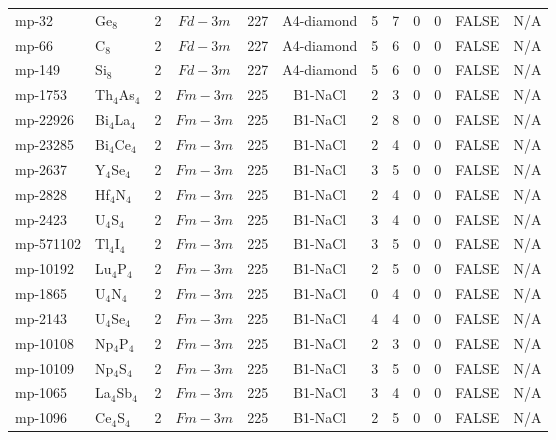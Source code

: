 {\begin{longtable}{llcccccccccc}
    mp-32 & Ge$_{8}$ & 2     & $Fd-3m$ & 227   & A4-diamond & 5     & 7     & 0     & 0     & FALSE & N/A \\
    mp-66 & C$_{8}$ & 2     & $Fd-3m$ & 227   & A4-diamond & 5     & 6     & 0     & 0     & FALSE & N/A \\
    mp-149 & Si$_{8}$ & 2     & $Fd-3m$ & 227   & A4-diamond & 5     & 6     & 0     & 0     & FALSE & N/A \\
    mp-1753 & Th$_{4}$As$_{4}$ & 2     & $Fm-3m$ & 225   & B1-NaCl & 2     & 3     & 0     & 0     & FALSE & N/A \\
    mp-22926 & Bi$_{4}$La$_{4}$ & 2     & $Fm-3m$ & 225   & B1-NaCl & 2     & 8     & 0     & 0     & FALSE & N/A \\
    mp-23285 & Bi$_{4}$Ce$_{4}$ & 2     & $Fm-3m$ & 225   & B1-NaCl & 2     & 4     & 0     & 0     & FALSE & N/A \\
    mp-2637 & Y$_{4}$Se$_{4}$ & 2     & $Fm-3m$ & 225   & B1-NaCl & 3     & 5     & 0     & 0     & FALSE & N/A \\
    mp-2828 & Hf$_{4}$N$_{4}$ & 2     & $Fm-3m$ & 225   & B1-NaCl & 2     & 4     & 0     & 0     & FALSE & N/A \\
    mp-2423 & U$_{4}$S$_{4}$ & 2     & $Fm-3m$ & 225   & B1-NaCl & 3     & 4     & 0     & 0     & FALSE & N/A \\
    mp-571102 & Tl$_{4}$I$_{4}$ & 2     & $Fm-3m$ & 225   & B1-NaCl & 3     & 5     & 0     & 0     & FALSE & N/A \\
    mp-10192 & Lu$_{4}$P$_{4}$ & 2     & $Fm-3m$ & 225   & B1-NaCl & 2     & 5     & 0     & 0     & FALSE & N/A \\
    mp-1865 & U$_{4}$N$_{4}$ & 2     & $Fm-3m$ & 225   & B1-NaCl & 0     & 4     & 0     & 0     & FALSE & N/A \\
    mp-2143 & U$_{4}$Se$_{4}$ & 2     & $Fm-3m$ & 225   & B1-NaCl & 4     & 4     & 0     & 0     & FALSE & N/A \\
    mp-10108 & Np$_{4}$P$_{4}$ & 2     & $Fm-3m$ & 225   & B1-NaCl & 2     & 3     & 0     & 0     & FALSE & N/A \\
    mp-10109 & Np$_{4}$S$_{4}$ & 2     & $Fm-3m$ & 225   & B1-NaCl & 3     & 5     & 0     & 0     & FALSE & N/A \\
    mp-1065 & La$_{4}$Sb$_{4}$ & 2     & $Fm-3m$ & 225   & B1-NaCl & 3     & 4     & 0     & 0     & FALSE & N/A \\
    mp-1096 & Ce$_{4}$S$_{4}$ & 2     & $Fm-3m$ & 225   & B1-NaCl & 2     & 5     & 0     & 0     & FALSE & N/A \\

\end{longtable}}

